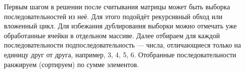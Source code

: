 \solutionSection

Первым шагом в решении после считывания матрицы может быть выборка последовательностей из неё. Для этого подойдёт рекурсивный обход или вложенный цикл. Для избежания дублирования выборки можно отмечать уже обработанные ячейки в отдельном массиве. Далее отбираем для каждой последовательности подпоследовательность — числа, отличающиеся только на единицу друг от друга, например, 3, 4, 5, 6. Отобранные последовательности ранжируем (сортируем) по сумме элементов.

\codeExample

